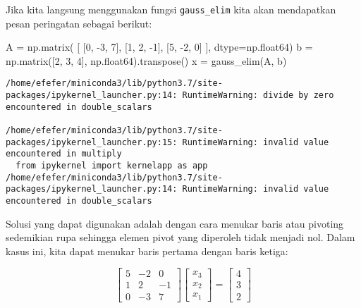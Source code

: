 \documentclass[10pt]{article}
\newenvironment{Shaded}{}{}
\newcommand{\DecValTok}[1]{\textcolor[rgb]{0.25,0.63,0.44}{{#1}}}
\newcommand{\NormalTok}[1]{{#1}}
\newcommand{\OperatorTok}[1]{\textcolor[rgb]{0.40,0.40,0.40}{{#1}}}
\begin{document}
    Jika kita langsung menggunakan fungsi \texttt{gauss\_elim} kita akan
mendapatkan pesan peringatan sebagai berikut:

\begin{Shaded}
\begin{Highlighting}[]
\NormalTok{A }\OperatorTok{=}\NormalTok{ np.matrix( [}
\NormalTok{    [}\DecValTok{0}\NormalTok{, }\DecValTok{-3}\NormalTok{, }\DecValTok{7}\NormalTok{],}
\NormalTok{    [}\DecValTok{1}\NormalTok{, }\DecValTok{2}\NormalTok{, }\DecValTok{-1}\NormalTok{],}
\NormalTok{    [}\DecValTok{5}\NormalTok{, }\DecValTok{-2}\NormalTok{, }\DecValTok{0}\NormalTok{]}
\NormalTok{], dtype}\OperatorTok{=}\NormalTok{np.float64)}
\NormalTok{b }\OperatorTok{=}\NormalTok{ np.matrix([}\DecValTok{2}\NormalTok{, }\DecValTok{3}\NormalTok{, }\DecValTok{4}\NormalTok{], np.float64).transpose()}
\NormalTok{x }\OperatorTok{=}\NormalTok{ gauss_elim(A, b)}
\end{Highlighting}
\end{Shaded}

\begin{verbatim}
/home/efefer/miniconda3/lib/python3.7/site-packages/ipykernel_launcher.py:14: RuntimeWarning: divide by zero encountered in double_scalars
  
/home/efefer/miniconda3/lib/python3.7/site-packages/ipykernel_launcher.py:15: RuntimeWarning: invalid value encountered in multiply
  from ipykernel import kernelapp as app
/home/efefer/miniconda3/lib/python3.7/site-packages/ipykernel_launcher.py:14: RuntimeWarning: invalid value encountered in double_scalars
\end{verbatim}

    Solusi yang dapat digunakan adalah dengan cara menukar baris atau
pivoting sedemikian rupa sehingga elemen pivot yang diperoleh tidak
menjadi nol. Dalam kasus ini, kita dapat menukar baris pertama dengan
baris ketiga:

\[
\begin{bmatrix}
5 & -2 & 0 \\
1 & 2 & -1 \\
0 & -3 & 7
\end{bmatrix}
\begin{bmatrix}
x_3 \\
x_2 \\
x_1
\end{bmatrix} =
\begin{bmatrix}
4 \\
3 \\
2
\end{bmatrix}
\]
\end{document}
